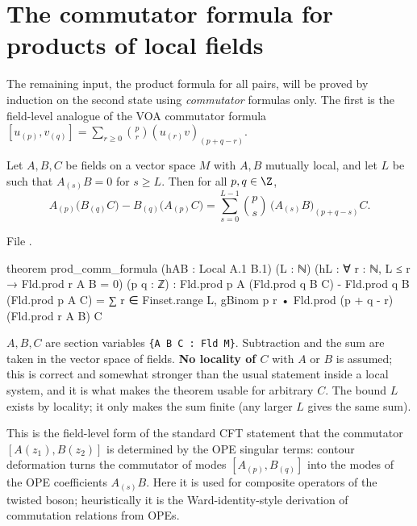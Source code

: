 \section{The commutator formula for products of local fields}\label{ch07:sec:comm}

The remaining input, the product formula for all pairs, will be proved by induction on the
second state using \emph{commutator} formulas only. The first is the field-level analogue of the
VOA commutator formula $[u_{(p)},v_{(q)}] = \sum_{r\ge0}\binom pr(u_{(r)}v)_{(p+q-r)}$.

\begin{theorem}\label{ch07:thm:comm}
Let $A,B,C$ be fields on a vector space $M$ with $A,B$ mutually local, and let $L$ be such that
$A_{(s)}B=0$ for $s\ge L$. Then for all $p,q\in\Z$,
\begin{equation*}
  A_{(p)}\bigl(B_{(q)}C\bigr) - B_{(q)}\bigl(A_{(p)}C\bigr) = \sum_{s=0}^{L-1}\binom ps\,
  \bigl(A_{(s)}B\bigr)_{(p+q-s)}C .
\end{equation*}
\end{theorem}

\noindent File .
\begin{leancode}
theorem prod_comm_formula (hAB : Local A.1 B.1) (L : ℕ)
    (hL : ∀ r : ℕ, L ≤ r → Fld.prod r A B = 0) (p q : ℤ) :
    Fld.prod p A (Fld.prod q B C) - Fld.prod q B (Fld.prod p A C)
      = ∑ r ∈ Finset.range L, gBinom p r • Fld.prod (p + q - r) (Fld.prod r A B) C
\end{leancode}

\begin{dictionary}
$A,B,C$ are section variables \verb|{A B C : Fld M}|. Subtraction and the sum are taken in the
vector space of fields. \textbf{No locality of $C$} with $A$ or $B$ is assumed; this is
correct and somewhat stronger than the usual statement inside a local system, and it is what
makes the theorem usable for arbitrary $C$. The bound $L$ exists by locality; it only makes the
sum finite (any larger $L$ gives the same sum).
\end{dictionary}

\begin{physics}
This is the field-level form of the standard CFT statement that the commutator $[A(z_1),B(z_2)]$ is determined by the OPE singular terms: contour deformation turns the commutator of modes $[A_{(p)},B_{(q)}]$ into the modes of the OPE coefficients $A_{(s)}B$. Here it is used for composite operators of the twisted boson; heuristically it is the Ward-identity-style derivation of commutation relations from OPEs.
\end{physics}

